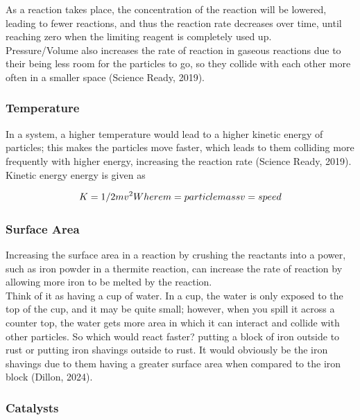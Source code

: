 As a reaction takes place, the concentration of the reaction will be lowered, leading to fewer reactions, and thus the reaction rate decreases over time, until reaching zero when the limiting reagent is completely used up. \\
Pressure/Volume also increases the rate of reaction in gaseous reactions due to their being less room for the particles to go, so they collide with each other more often in a smaller space (Science Ready, 2019).

\subsubsection{Temperature}
In a system, a higher temperature would lead to a higher kinetic energy of particles; this makes the particles move faster, which leads to them colliding more frequently with higher energy, increasing the reaction rate (Science Ready, 2019).
Kinetic energy energy is given as


\begin{figure}[htp]
    \centering
    \[
         K = 1/2 mv^2 \\
        Where \\
        m = particle mass \\
        v  = speed
    \]
    \caption{}
    \label{fig:enter-label}
\end{figure}

\subsubsection{Surface Area}
Increasing the surface area in a reaction by crushing the reactants into a power, such as iron powder in a thermite reaction, can increase the rate of reaction by allowing more iron to be melted by the reaction. \\
Think of it as having a cup of water. In a cup, the water is only exposed to the top of the cup, and it may be quite small; however, when you spill it across a counter top, the water gets more area in which it can interact and collide with other particles. So which would react faster? putting a block of iron outside to rust or putting iron shavings outside to rust. It would obviously be the iron shavings due to them having a greater surface area when compared to the iron block (Dillon, 2024).

\subsubsection{Catalysts}




